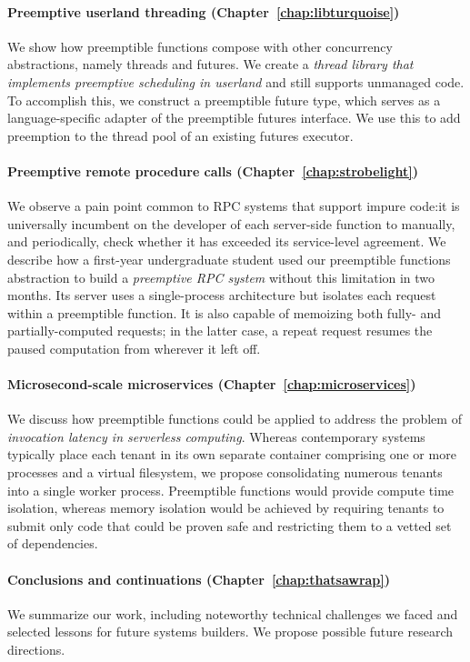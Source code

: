 \paragraph{Preemptive userland threading (Chapter~\ref{chap:libturquoise})}
We show how preemptible functions compose with other concurrency abstractions, namely
threads and futures.  We create a \textit{thread library that implements preemptive
scheduling in userland} and still supports unmanaged code.  To accomplish this, we
construct a preemptible future type, which serves as a language-specific adapter of
the preemptible futures interface.  We use this to add preemption to the thread pool
of an existing futures executor.

\paragraph{Preemptive remote procedure calls (Chapter~\ref{chap:strobelight})}
We observe a pain point common to RPC systems that support impure code:\@ it is
universally incumbent on the developer of each server-side function to manually, and
periodically, check whether it has exceeded its service-level agreement.  We describe
how a first-year undergraduate student used our preemptible functions abstraction to
build a \textit{preemptive RPC system} without
this limitation in two months.  Its server uses a single-process architecture but
isolates each request within a preemptible function.  It is also capable of memoizing
both fully- and partially-computed requests; in the latter case, a repeat request
resumes the paused computation from wherever it left off.

\paragraph{Microsecond-scale microservices (Chapter~\ref{chap:microservices})}
We discuss how preemptible functions could be applied to address the problem of
\textit{invocation latency in serverless computing}.  Whereas contemporary systems
typically
place each tenant in its own separate container comprising one or more processes and
a virtual filesystem, we propose consolidating numerous tenants into a single worker
process.  Preemptible functions would provide compute time isolation, whereas memory
isolation would be achieved by requiring tenants to submit only code that could be
proven safe and restricting them to a vetted set of dependencies.

\paragraph{Conclusions and continuations (Chapter~\ref{chap:thatsawrap})}
We summarize our work, including noteworthy technical challenges we faced and
selected lessons for future systems builders.  We propose possible future research
directions.
